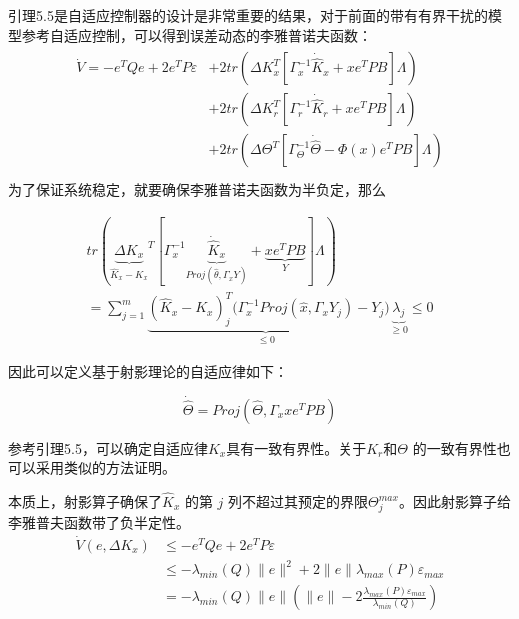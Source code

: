 引理5.5是自适应控制器的设计是非常重要的结果，对于前面的带有有界干扰的模型参考自适应控制，可以得到误差动态的李雅普诺夫函数：
\begin{equation}
\begin{array}{l}
\begin{split}
 \dot V =  - {e^T}Qe + 2e^{T}P\varepsilon &+ 2tr\left( {\Delta K_x^T\left[ {\Gamma _x^{ - 1}{{\dot {\hat K}}_x} + x{e^T}PB} \right]\Lambda } \right) \\
 &+  2tr\left( {\Delta K_r^T\left[ {\Gamma _r^{ - 1}{{\dot {\hat K}}_r} + x{e^T}PB} \right]\Lambda } \right) \\
 &+ 2tr\left( {\Delta {\Theta ^T}\left[ {\Gamma _\Theta ^{ - 1}\dot {\hat \Theta}  - \Phi \left( x \right){e^T}PB} \right]\Lambda } \right) \\
 \end{split}
 \end{array}
\end{equation}
为了保证系统稳定，就要确保李雅普诺夫函数为半负定，那么

\begin{equation}
\begin{aligned}
tr\left( {{\underbrace {\Delta K_x}_{\hat K_x - K_x}}^T\left[ {\Gamma _x^{ - 1}{\underbrace{\dot{\hat K}_x}_{Proj(\hat \theta, \Gamma _x Y)}} + \underbrace {x{e^T}PB}_{Y}} \right]\Lambda } \right) \\
= \sum_{j = 1}^{m}\underbrace{(\hat {K}_x - {K}_x)_j^T(\Gamma_x^{-1} Proj(\hat
x,\Gamma_x Y_j)-Y_j}_{\leq 0})\underbrace{\lambda_j}_{\geq 0} \leq 0
\end{aligned}
\end{equation}

因此可以定义基于射影理论的自适应律如下：

\begin{equation}
\dot {\hat{\Theta}} = Proj(\hat{\Theta},\Gamma_x x e^T PB)
\end{equation}

参考引理5.5，可以确定自适应律$K_{x}$具有一致有界性。关于$K_r$和$\Theta$ 的一致有界性也可以采用类似的方法证明。

本质上，射影算子确保了$\hat K_x$ 的第 $j$ 列不超过其预定的界限$\Theta_j^{max}$。因此射影算子给李雅普夫函数带了负半定性。
\begin{equation}
\begin{aligned}
\dot V(e,\Delta K_x) &\leq - e^T Q e + 2 e^T P \varepsilon \\
&\leq -\lambda_{min}(Q) \|e \|^2 + 2  \|e \| \lambda_{max}(P) \varepsilon_{max}\\
&=-\lambda_{min}(Q) \|e \|(\|e \| - 2\frac{\lambda_{max}(P)\varepsilon_{max}}{\lambda_{min}(Q)})
\end{aligned}
\end{equation}

